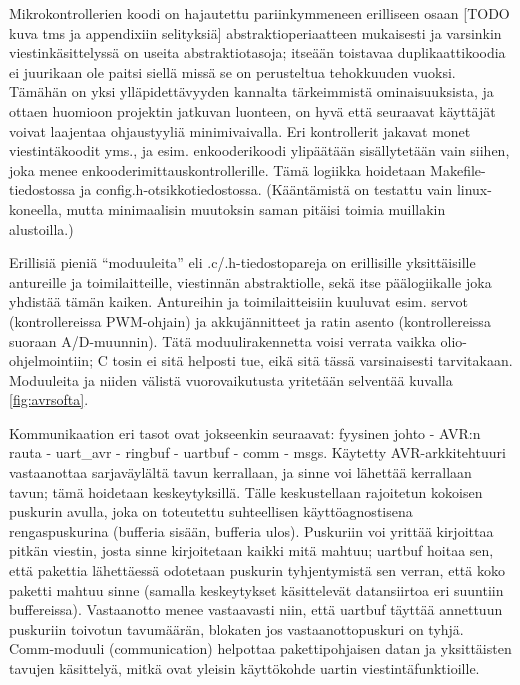 \documentclass{article}
\newcommand{\kuvaa}[4]{%
	\begin{figure}[h]%
		\centering \texttt{[image: \#2]}%
		\caption{#3 \label{fig:#4}}%
	\end{figure}%
}
\begin{document}
Mikrokontrollerien koodi on hajautettu pariinkymmeneen erilliseen osaan [TODO kuva tms ja appendixiin selityksiä] abstraktioperiaatteen mukaisesti ja varsinkin viestinkäsittelyssä on useita abstraktiotasoja; itseään toistavaa duplikaattikoodia ei juurikaan ole paitsi siellä missä se on perusteltua tehokkuuden vuoksi. Tämähän on yksi ylläpidettävyyden kannalta tärkeimmistä ominaisuuksista, ja ottaen huomioon projektin jatkuvan luonteen, on hyvä että seuraavat käyttäjät voivat laajentaa ohjaustyyliä minimivaivalla. Eri kontrollerit jakavat monet viestintäkoodit yms., ja esim. enkooderikoodi ylipäätään sisällytetään vain siihen, joka menee enkooderimittauskontrollerille. Tämä logiikka hoidetaan Makefile-tiedostossa \cite{bib:make} ja config.h-otsikkotiedostossa. (Kääntämistä on testattu vain linux-koneella, mutta minimaalisin muutoksin saman pitäisi toimia muillakin alustoilla.)

Erillisiä pieniä ``moduuleita'' eli .c/.h-tiedostopareja on erillisille yksittäisille antureille ja toimilaitteille, viestinnän abstraktiolle, sekä itse päälogiikalle joka yhdistää tämän kaiken. Antureihin ja toimilaitteisiin kuuluvat esim. servot (kontrollereissa PWM-ohjain) ja akkujännitteet ja ratin asento (kontrollereissa suoraan A/D-muunnin). Tätä moduulirakennetta voisi verrata vaikka olio-ohjelmointiin; C tosin ei sitä helposti tue, eikä sitä tässä varsinaisesti tarvitakaan. Moduuleita ja niiden välistä vuorovaikutusta yritetään selventää kuvalla \ref{fig:avrsofta}.


Kommunikaation eri tasot ovat jokseenkin seuraavat: fyysinen johto - AVR:n rauta - uart\_avr - ringbuf - uartbuf - comm - msgs. Käytetty AVR-arkkitehtuuri vastaanottaa sarjaväylältä tavun kerrallaan, ja sinne voi lähettää kerrallaan tavun; tämä hoidetaan keskeytyksillä. Tälle keskustellaan rajoitetun kokoisen puskurin avulla, joka on toteutettu suhteellisen käyttöagnostisena rengaspuskurina (bufferia sisään, bufferia ulos). Puskuriin voi yrittää kirjoittaa pitkän viestin, josta sinne kirjoitetaan kaikki mitä mahtuu; uartbuf hoitaa sen, että pakettia lähettäessä odotetaan puskurin tyhjentymistä sen verran, että koko paketti mahtuu sinne (samalla keskeytykset käsittelevät datansiirtoa eri suuntiin buffereissa). Vastaanotto menee vastaavasti niin, että uartbuf täyttää annettuun puskuriin toivotun tavumäärän, blokaten jos vastaanottopuskuri on tyhjä. Comm-moduuli (communication) helpottaa pakettipohjaisen datan ja yksittäisten tavujen käsittelyä, mitkä ovat yleisin käyttökohde uartin viestintäfunktioille. 
\end{document}
